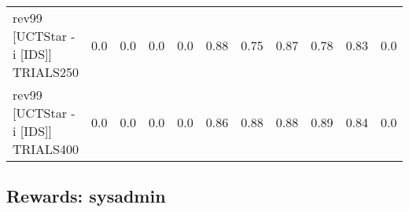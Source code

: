 \documentclass{article}
\begin{document}
\begin{tabular}{|l|r@{$\pm$}rr@{$\pm$}rr@{$\pm$}rr@{$\pm$}rr@{$\pm$}rr@{$\pm$}rr@{$\pm$}rr@{$\pm$}rr@{$\pm$}rr@{$\pm$}r|}
\\
rev99 [UCTStar -i [IDS]] TRIALS250
& \multicolumn{2}{c}{0.0}
& \multicolumn{2}{c}{0.0}
& \multicolumn{2}{c}{0.0}
& \multicolumn{2}{c}{0.0}
& \multicolumn{2}{c}{0.88}
& \multicolumn{2}{c}{0.75}
& \multicolumn{2}{c}{0.87}
& \multicolumn{2}{c}{0.78}
& \multicolumn{2}{c}{0.83}
& \multicolumn{2}{c|}{0.0}
\\
rev99 [UCTStar -i [IDS]] TRIALS400
& \multicolumn{2}{c}{0.0}
& \multicolumn{2}{c}{0.0}
& \multicolumn{2}{c}{0.0}
& \multicolumn{2}{c}{0.0}
& \multicolumn{2}{c}{0.86}
& \multicolumn{2}{c}{0.88}
& \multicolumn{2}{c}{0.88}
& \multicolumn{2}{c}{0.89}
& \multicolumn{2}{c}{0.84}
& \multicolumn{2}{c|}{0.0}
\\
\hline
\end{tabular}%

\bigskip

\subsection*{Rewards: sysadmin}
\end{document}
